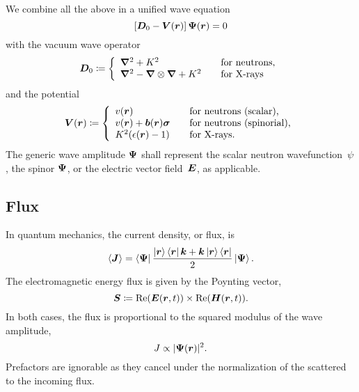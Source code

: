 We combine all the above in a unified wave equation
%
\begin{equation}\label{EWAVE}
  \left[ \TDo - \TV(\r) \right] \v\Psi(\r) = 0
\end{equation}
with the vacuum wave operator
%
%
\begin{equation}\label{EDo}
  \TDo \coloneqq \left\{ \begin{array}{ll}
      \Nabla^2 + K^2                     &\text{~~~for neutrons,}\\
      \Nabla^2 - \Nabla\otimes\Nabla + K^2 &\text{~~~for X-rays}
  \end{array}\right.
\end{equation}
%
and the potential
%
%
\begin{equation}\label{ETV}
  \TV(\r) \coloneqq \left\{ \begin{array}{ll}
      v(\r)                       &\text{~~~for neutrons (scalar),}\\
      v(\r)+\v{b}(\r)\PauliVec    &\text{~~~for neutrons (spinorial),}\\
      K^2(\epsilon(\r)-1)         &\text{~~~for X-rays.}
  \end{array}\right.
\end{equation}
The generic wave amplitude $\bm{\Psi}$
%
shall represent
the scalar neutron wavefunction~$\psi$,
the spinor $\bm{\Psi}$, or the electric vector field~$\bm{E}$, as applicable.

\subsection{Flux}\label{Sflux}

In quantum mechanics, the current density, or flux, is
\begin{equation}\label{EdefJop}
  \braket{\v{J}}
  = \Bra{\v\Psi}\frac{\ket{\r}\bra{\r}\k + \k\ket{\r}\bra{\r}}{2}\Ket{\v\Psi}.
\end{equation}
%
%
The electromagnetic energy flux is given by the Poynting vector,
%
%
%
\begin{equation}
  \bm{S}\coloneqq \operatorname{Re}(\bm{E}(\bm{r},t))\times\operatorname{Re}(\bm{H}(\bm{r},t)).
\end{equation}
%
In both cases, the flux is proportional to the
squared modulus of the wave amplitude,
\begin{equation}\label{EFLUX}
   J \propto |\v\Psi(\r)|^2.
\end{equation}
Prefactors are ignorable as they cancel
under the normalization of the scattered to the incoming flux.


